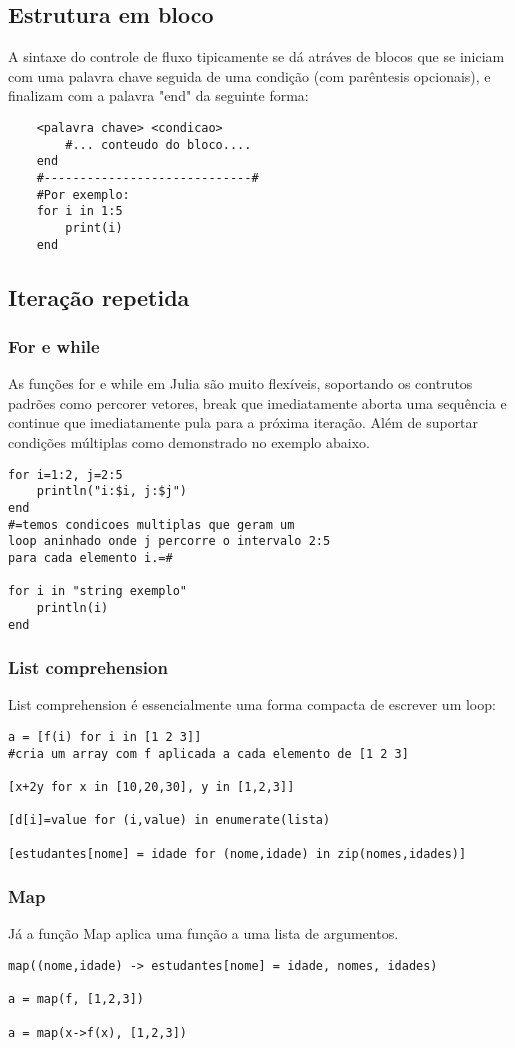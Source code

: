 \subsection{Estrutura em bloco}
A sintaxe do controle de fluxo tipicamente se dá atráves de blocos que se iniciam com uma palavra chave seguida de uma condição (com parêntesis opcionais), e finalizam com a palavra "end" da seguinte forma: 
    \begin{lstlisting}
    <palavra chave> <condicao>
        #... conteudo do bloco....
    end 
    #-----------------------------#
    #Por exemplo:
    for i in 1:5
        print(i)
    end     
    \end{lstlisting}

\subsection{Iteração repetida}
\subsubsection{For e while}
As funções for e while em Julia são muito flexíveis, soportando os contrutos padrões como percorer vetores, break que imediatamente aborta uma sequência e continue que imediatamente pula para a próxima iteração. Além de suportar condições múltiplas como demonstrado no exemplo abaixo. 
\begin{lstlisting}
for i=1:2, j=2:5
	println("i:$i, j:$j")
end
#=temos condicoes multiplas que geram um 
loop aninhado onde j percorre o intervalo 2:5 
para cada elemento i.=#

for i in "string exemplo"
	println(i)
end 
\end{lstlisting}
\subsubsection{List comprehension}
List comprehension é essencialmente uma forma compacta de escrever um loop:
\begin{lstlisting}
a = [f(i) for i in [1 2 3]] 
#cria um array com f aplicada a cada elemento de [1 2 3]

[x+2y for x in [10,20,30], y in [1,2,3]]

[d[i]=value for (i,value) in enumerate(lista)

[estudantes[nome] = idade for (nome,idade) in zip(nomes,idades)]
\end{lstlisting}
\subsubsection{Map}
Já a função Map aplica uma função a uma lista de argumentos.
\begin{lstlisting}
map((nome,idade) -> estudantes[nome] = idade, nomes, idades)

a = map(f, [1,2,3]) 

a = map(x->f(x), [1,2,3])
\end{lstlisting}

